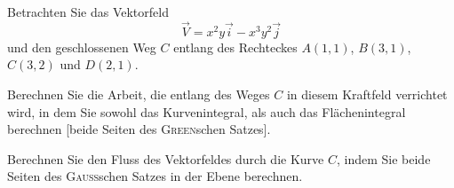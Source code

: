 \begin{atiTask}[
  title = Zweidimensionales Vektorfeld
]
Betrachten Sie das Vektorfeld
\[
\vec{V}=x^2y\vec{i}-x^3y^2\vec{j}\]
und den geschlossenen Weg $C$ entlang des Rechteckes $A(1,1)$, $B(3,1)$, $C(3,2)$ und $D(2,1)$.
\begin{atiSubtasks}
\item Berechnen Sie die Arbeit, die entlang des Weges $C$ in diesem Kraftfeld verrichtet wird, in dem Sie sowohl das Kurvenintegral, als auch das Flächenintegral berechnen [beide Seiten des \textsc{Green}schen Satzes].
\item Berechnen Sie den Fluss des Vektorfeldes durch die Kurve $C$, indem Sie beide Seiten des \textsc{Gauß}schen Satzes in der Ebene berechnen.
\end{atiSubtasks}
\end{atiTask}